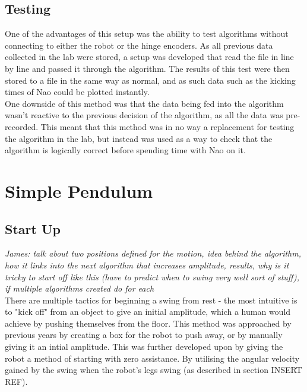 \documentclass[11pt]{article}
\newcommand*\ruleline[1]{\par\noindent\raisebox{.8ex}{\makebox[\linewidth]{\hrulefill\hspace{1ex}\raisebox{-.8ex}{#1}\hspace{1ex}\hrulefill}}}
\begin{document}
\subsection{Testing}
One of the advantages of this setup was the ability to test algorithms without connecting to either the robot or the hinge encoders. As all previous data collected in the lab were stored, a setup was developed that read the file in line by line and passed it through the algorithm. The results of this test were then stored to a file in the same way as normal, and as such data such as the kicking times of Nao could be plotted instantly.\\

One downside of this method was that the data being fed into the algorithm wasn't reactive to the previous decision of the algorithm, as all the data was pre-recorded. This meant that this method was in no way a replacement for testing the algorithm in the lab, but instead was used as a way to check that the algorithm is logically correct before spending time with Nao on it.


\section{Simple Pendulum}
\subsection{Start Up}

\ruleline{James Doering}

\textit{James: talk about two positions defined for the motion, idea behind the algorithm, how it links into the next algorithm that increases amplitude, results, why is it tricky to start off like this (have to predict when to swing very well sort of stuff), if multiple algorithms created do for each} \\

There are multiple tactics for beginning a swing from rest - the most intuitive is to "kick off" from an object to give an initial amplitude, which a human would achieve by pushing themselves from the floor. This method was approached by previous years by creating a box for the robot to push away, or by manually giving it an intial amplitude. This was further developed upon by giving the robot a method of starting with zero assistance. By utilising the angular velocity gained by the swing when the robot's legs swing (as described in section INSERT REF). \\
\end{document}
